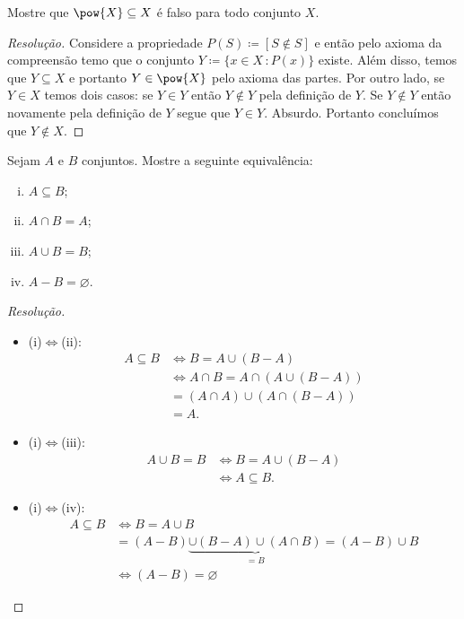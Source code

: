 \documentclass[a4paper]{article}
\begin{document}
\begin{exercicio}
Mostre que \(\pow{X}\subseteq X\) é falso para todo conjunto \(X\).
\end{exercicio}
\begin{proof}[Resolução]
  Considere a propriedade \(P(S)\coloneqq [S\not\in S]\) e então pelo axioma da
  compreensão temo que o conjunto \(Y\coloneqq\{x\in X\,\colon P(x)\}\) existe.
  Além disso, temos que \(Y\subseteq X\) e portanto \(Y\in\pow{X}\) pelo axioma
  das partes. Por outro lado, se \(Y\in X\) temos dois casos: se \(Y\in Y\)
  então \(Y\not\in Y\) pela definição de \(Y\). Se \(Y\not\in Y\) então
  novamente pela definição de \(Y\) segue que \(Y\in Y\). Absurdo.
  Portanto concluímos que \(Y\not\in X\).
\end{proof}
\begin{exercicio}
  Sejam \(A\) e \(B\) conjuntos. Mostre a seguinte equivalência:
  \begin{enumerate}[(i)]
  \item \(A\subseteq B\);
  \item \(A\cap B = A\);
  \item \(A\cup B = B\);
  \item \(A-B = \varnothing\).
  \end{enumerate}
\end{exercicio}
\begin{proof}[Resolução]
  \begin{itemize}
  \item (i)\(\iff\)(ii): \begin{align*}
                               A\subseteq B &\iff B = A\cup (B-A)
                                 \\&\iff A\cap B = A \cap ( A\cup (B-A))
                                 \\&= (A\cap A)\cup (A\cap (B-A))
                                 \\&=A.
                             \end{align*}
   \item (i)\(\iff\)(iii): \begin{align*}
   A\cup B= B &\iff B = A \cup (B-A)\\&\iff A\subseteq B.\end{align*}
                                                           

 \item (i)\(\iff\)(iv):\begin{align*}
      A\subseteq B & \iff B=A\cup B \\& = (A-B)\underbrace{\cup(B-A)\cup(A\cap B)}_{=B}=(A-B)\cup B
                                                                                  \\& \iff (A-B)=\varnothing
                                                                                   \end{align*}

                                                         \end{itemize}
\end{proof}
\end{document}
